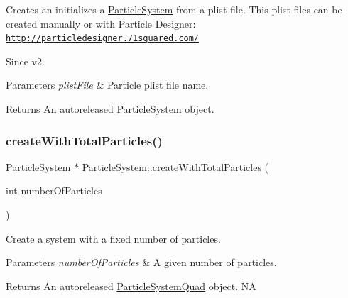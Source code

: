 Creates an initializes a \hyperlink{classParticleSystem}{Particle\+System} from a plist file. This plist files can be created manually or with Particle Designer\+: \href{http://particledesigner.71squared.com/}{\tt http\+://particledesigner.\+71squared.\+com/} \begin{DoxySince}{Since}
v2.
\end{DoxySince}

\begin{DoxyParams}{Parameters}
{\em plist\+File} & Particle plist file name. \\
\hline
\end{DoxyParams}
\begin{DoxyReturn}{Returns}
An autoreleased \hyperlink{classParticleSystem}{Particle\+System} object. 
\end{DoxyReturn}
\mbox{\label{classParticleSystem_a591e13344da2d2d0f10ffc6fc86b8fca}} 
\subsubsection{\texorpdfstring{create\+With\+Total\+Particles()}{createWithTotalParticles()}\hspace{0.1cm}{\footnotesize\ttfamily [1/2]}}
{\footnotesize\ttfamily \hyperlink{classParticleSystem}{Particle\+System} $\ast$ Particle\+System\+::create\+With\+Total\+Particles (\begin{DoxyParamCaption}\item[{int}]{number\+Of\+Particles }\end{DoxyParamCaption})\hspace{0.3cm}{\ttfamily [static]}}

Create a system with a fixed number of particles.


\begin{DoxyParams}{Parameters}
{\em number\+Of\+Particles} & A given number of particles. \\
\hline
\end{DoxyParams}
\begin{DoxyReturn}{Returns}
An autoreleased \hyperlink{classParticleSystemQuad}{Particle\+System\+Quad} object.  NA 
\end{DoxyReturn}
\mbox{\label{classParticleSystem_a668f8c6d2565694be34420236e76b30d}} 
